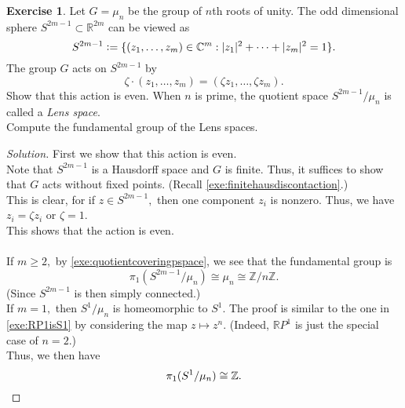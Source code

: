 \documentclass[12pt]{article}
\theoremstyle{definition}
\numberwithin{thm}{section}
\newtheorem{exe}[thm]{Exercise}
\newenvironment{soln}{\begin{proof}[Solution]}{\end{proof}}
\begin{document}
\begin{exe}
	Let $G = \mu_n$ be the group of $n$th roots of unity. The odd dimensional sphere $S^{2m - 1} \subset \mathbb{R}^{2m}$ can be viewed as
	\begin{equation*} 
		S^{2m - 1} \vcentcolon= \{(z_1, \ldots, z_m) \in \mathbb{C}^m : |z_1|^2 + \cdots + |z_m|^2 = 1\}.
	\end{equation*}
	The group $G$ acts on $S^{2m - 1}$ by 
	\begin{equation*} 
		\zeta\cdot(z_1, \ldots, z_m) = (\zeta z_1, \ldots, \zeta z_m).
	\end{equation*}
	Show that this action is even. When $n$ is prime, the quotient space $S^{2m - 1}/\mu_n$ is called a \emph{Lens space}.\\
	Compute the fundamental group of the Lens spaces.
\end{exe}
\begin{soln}
	First we show that this action is even. \\
	Note that $S^{2m - 1}$ is a Hausdorff space and $G$ is finite. Thus, it suffices to show that $G$ acts without fixed points. (Recall \cref{exe:finitehausdiscontaction}.)\\
	This is clear, for if $z \in S^{2m - 1},$ then one component $z_i$ is nonzero. Thus, we have $z_i = \zeta z_i$ or $\zeta = 1.$\\
	This shows that the action is even. \\~\\
	If $m \ge 2,$ by \cref{exe:quotientcoveringpspace}, we see that the fundamental group is 
	\begin{equation*} 
		\pi_1(S^{2m - 1}/\mu_n) \cong \mu_n \cong \mathbb{Z}/n\mathbb{Z}.
	\end{equation*} (Since $S^{2m - 1}$ is then simply connected.) \\
	If $m = 1,$ then $S^1/\mu_n$ is homeomorphic to $S^1.$ The proof is similar to the one in \cref{exe:RP1isS1} by considering the map $z \mapsto z^n.$ (Indeed, $\mathbb{R}P^1$ is just the special case of $n = 2.$)\\
	Thus, we then have
	\begin{equation*} 
		\pi_1(S^1/\mu_n) \cong \mathbb{Z}. \qedhere
	\end{equation*}
\end{soln}
\end{document}
